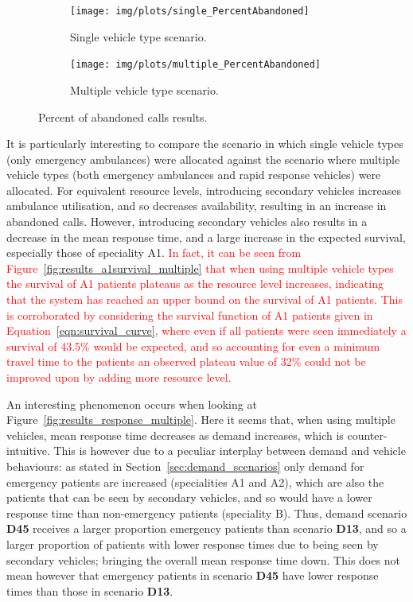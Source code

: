 \documentclass[numbers,webpdf,imaman]{ima-authoring-template}%
\begin{document}
\begin{figure}[htb!]
\begin{center}
\begin{subfigure}{0.4\textwidth}
\texttt{[image: img/plots/single\_PercentAbandoned]}
\caption{Single vehicle type scenario.}
\label{fig:results_abandoned_single}
\end{subfigure}
\begin{subfigure}{0.4\textwidth}
\texttt{[image: img/plots/multiple\_PercentAbandoned]}
\caption{Multiple vehicle type scenario.}
\label{fig:results_abandoned_multiple}
\end{subfigure} 
\end{center}
\caption{Percent of abandoned calls results.}
\end{figure}

It is particularly interesting to compare the scenario in which single vehicle
types (only emergency ambulances) were allocated against the scenario where
multiple vehicle types (both emergency ambulances and rapid response vehicles)
were allocated. For equivalent resource levels, introducing secondary vehicles
increases ambulance utilisation, and so decreases availability, resulting in
an increase in abandoned calls. However, introducing secondary vehicles also
results in a decrease in the mean response time, and a large increase in the
expected survival, especially those of speciality A1.
\textcolor{red}{In fact, it can be seen from Figure~\ref{fig:results_a1survival_multiple} that when using multiple vehicle types the survival of A1 patients plateaus as the resource level increases, indicating that the system has reached an upper bound on the survival of A1 patients. This is corroborated by considering the survival function of A1 patients given in Equation~\ref{eqn:survival_curve}, where even if all patients were seen immediately a survival of 43.5\% would be expected, and so accounting for even a minimum travel time to the patients an observed plateau value of 32\% could not be improved upon by adding more resource level.}

An interesting phenomenon occurs when looking at
Figure~\ref{fig:results_response_multiple}. Here it seems that, when using
multiple vehicles, mean response time decreases as demand increases, which is
counter-intuitive. This is however due to a peculiar interplay between demand
and vehicle behaviours: as stated in
Section~\ref{sec:demand_scenarios} only demand for emergency patients are
increased (specialities A1 and A2), which are also the patients that can be seen
by secondary vehicles, and so would have a lower response time than
non-emergency patients (speciality B). Thus, demand scenario \textbf{D45}
receives a larger proportion emergency patients than scenario \textbf{D13}, and
so a larger proportion of patients with lower response times due to being seen
by secondary vehicles; bringing the overall mean response time down. This does
not mean however that emergency patients in scenario \textbf{D45} have lower
response times than those in scenario \textbf{D13}.
\end{document}
